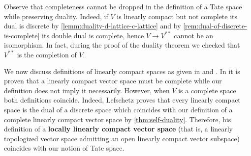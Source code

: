 \begin{remark}\label{rem:completeness-is-necessary-for-sel-duality}
	Observe that completeness cannot be dropped in the definition of a Tate space while preserving duality. Indeed, if $V$ is linearly compact but not complete its dual is discrete by \cref{lemm:duality-d-lattice-c-lattice} and by \cref{rem:dual-of-discrete-is-complete} its double dual is complete, hence $V \to V^{**}$ cannot be an isomorphism. In fact, during the proof of the duality theorem we checked that $V^{**}$ is the completion of $V$. 
\end{remark}
\begin{remark}\label{rem:lef-vs-beilinson}
	We now discuss definitions of linearly compact spaces as given in \cite{Lefschetz-Alg-Top} and \cite{Chiral}. In \cite{Lefschetz-Alg-Top} it is proven that a linearly compact vector space must be complete while our definition does not imply it necessarily. However, when $V$ is a complete space both definitions coincide. Indeed, Lefschetz proves that every linearly compact space is the dual of a discrete space which coincides with our definition of a complete linearly compact vector space by \cref{thm:self-duality}. Therefore, his definition of a \textbf{locally linearly compact vector space} (that is, a linearly topologized vector space admitting an open linearly compact vector subspace) coincides with our notion of Tate space.
\end{remark}
